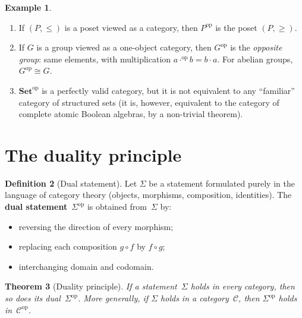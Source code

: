 \documentclass[a4paper,12pt]{book}
\newcommand{\Set}{\mathbf{Set}}
\newcommand{\op}{\mathrm{op}}
\theoremstyle{definition}
\newtheorem{definition}{Definition}[section]
\newtheorem{example}[definition]{Example}
\theoremstyle{plain}
\newtheorem{theorem}[definition]{Theorem}
\theoremstyle{remark}
\begin{document}
\begin{example}\label{ex:op-examples}
\begin{enumerate}[label=(\roman*)]
    \item If $(P,\le)$ is a poset viewed as a category, then
          $P^{\op}$ is the poset $(P,\ge)$.
    \item If $G$ is a group viewed as a one-object category, then
          $G^{\op}$ is the \emph{opposite group}: same elements,
          with multiplication $a\cdot^{\op}b = b\cdot a$.
          For abelian groups, $G^{\op}\cong G$.
    \item $\Set^{\op}$ is a perfectly valid category, but it is not
          equivalent to any ``familiar'' category of structured sets
          (it is, however, equivalent to the category of complete
          atomic Boolean algebras, by a non-trivial theorem).
          \index{category!Set op@$\Set^{\op}$}
\end{enumerate}
\end{example}


\section{The duality principle}\label{sec:duality-principle}

\begin{definition}[Dual statement]\label{def:dual-statement}
Let $\Sigma$ be a statement formulated purely in the language of
category theory (objects, morphisms, composition, identities).
The \textbf{dual statement}~$\Sigma^{\op}$ is obtained from~$\Sigma$
by:
\begin{itemize}
    \item reversing the direction of every morphism;
    \item replacing each composition $g\circ f$ by $f\circ g$;
    \item interchanging domain and codomain.
\end{itemize}
\end{definition}

\begin{theorem}[Duality principle]\label{thm:duality-principle}
If a statement~$\Sigma$ holds in every category, then so does its
dual~$\Sigma^{\op}$.
More generally, if $\Sigma$ holds in a category~$\mathcal{C}$, then
$\Sigma^{\op}$ holds in~$\mathcal{C}^{\op}$.
\end{theorem}
\end{document}
